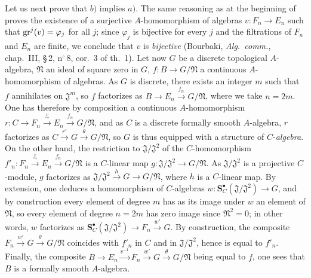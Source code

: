\begin{env}[19.5.4.3]
\label{0.19.5.4.3}
Let us next prove that $b)$ implies $a)$.
The same reasoning as at the beginning of  proves the existence of a surjective $A$-homomorphism of algebras $v:F_n\to E_n$ such that $\operatorname{gr}^j(v)=\varphi_j$ for all $j$; since $\varphi_j$ is bijective for every $j$ and the filtrations of $F_n$ and $E_n$ are finite, we conclude that $v$ is \emph{bijective} (Bourbaki, \emph{Alg.\ comm.}, chap.~III, \S\,2, n$^\circ$\,8, cor.~3 of th.~1).
Let now $G$ be a discrete topological $A$-algebra, $\mathfrak N$ an ideal of square zero in $G$, $f:B\to G/\mathfrak N$ a continuous $A$-homomorphism of algebras.
As $G$ is discrete, there exists an integer $m$ such that $f$ annihilates on $\mathfrak{J}^m$, so $f$ factorizes as $B\to E_n\xrightarrow{f_n}G/\mathfrak N$, where we take $n=2m$.
One has therefore by composition a continuous $A$-homomorphism $r:C\to F_n\xrightarrow{\overset{v}{\sim}}E_n\xrightarrow{f_n}G/\mathfrak N$, and as $C$ is a discrete formally smooth $A$-algebra, $r$ factorizes as $C\xrightarrow{r'}G\xrightarrow{\theta}G/\mathfrak N$, so $G$ is thus equipped with a structure of $C$-\emph{algebra}.
On the other hand, the restriction to $\mathfrak{J}/\mathfrak{J}^2$ of the $C$-homomorphism $f'_n:F_n\xrightarrow{\overset{v}{\sim}}E_n\xrightarrow{f_n}G/\mathfrak N$ is a $C$-linear map $g:\mathfrak{J}/\mathfrak{J}^2\to G/\mathfrak N$.
As $\mathfrak{J}/\mathfrak{J}^2$ is a projective $C$-module, $g$ factorizes as $\mathfrak{J}/\mathfrak{J}^2\xrightarrow{h}G\to G/\mathfrak N$, where $h$ is a $C$-linear map.
By extension, one deduces a homomorphism of $C$-algebras $w:\mathbf{S}_C^\bullet(\mathfrak{J}/\mathfrak{J}^2)\to G$, and by construction every element of degree $m$ has as its image under $w$ an element of $\mathfrak N$, so every element of degree $n=2m$ has zero image since $\mathfrak N^2=0$;
in other words, $w$ factorizes as $\mathbf{S}_C^\bullet(\mathfrak{J}/\mathfrak{J}^2)\to F_n\xrightarrow{w'}G$.
By construction, the composite $F_n\xrightarrow{w'}G\xrightarrow{\theta}G/\mathfrak N$ coincides with $f'_n$ in $C$ and in $\mathfrak{J}/\mathfrak{J}^2$, hence is equal to $f'_n$.
Finally, the composite $B\to E_n\xrightarrow{v^{-1}}F_n\xrightarrow{w'}G\xrightarrow{\theta}G/\mathfrak N$ being equal to $f$, one sees that $B$ is a formally smooth $A$-algebra.
\end{env}

